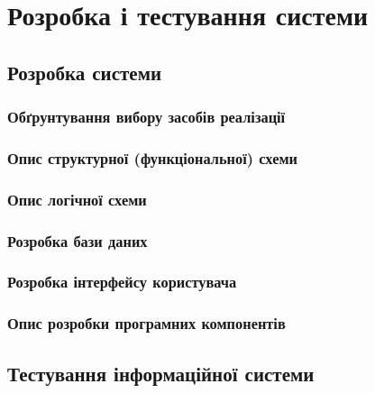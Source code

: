 \documentclass[../main.tex]{subfiles}
\begin{document}
	
\chapter{Розробка і тестування системи}
	
\section{Розробка  системи}
	
\subsection{Обґрунтування вибору засобів реалізації}

\subsection{Опис структурної (функціональної) схеми}

\subsection{Опис логічної схеми}

\subsection{Розробка бази даних}

\subsection{Розробка інтерфейсу користувача}

\subsection{Опис розробки програмних компонентів}

\section{Тестування інформаційної системи}
	
	
\end{document}
